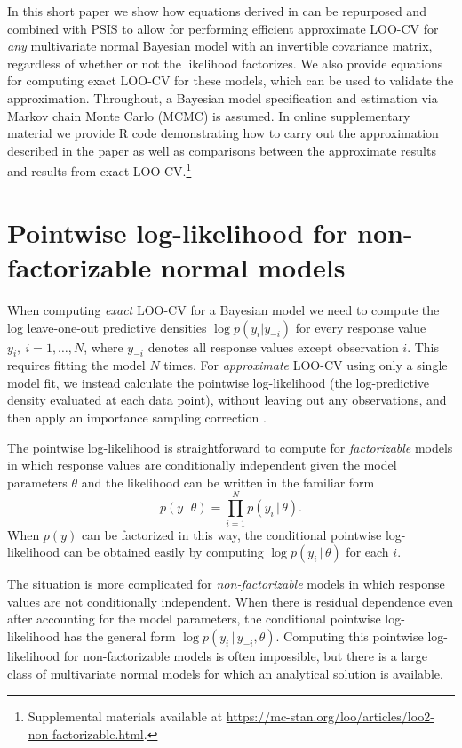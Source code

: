 \documentclass[11pt]{article}
\begin{document}
In this short paper we show how equations derived in \cite{sundararajan2001} can
be repurposed and combined with PSIS to allow for performing efficient
approximate LOO-CV for \emph{any} multivariate normal Bayesian model with an
invertible covariance matrix, regardless of whether or not the likelihood
factorizes. We also provide equations for computing exact LOO-CV for these
models, which can be used to validate the approximation. Throughout, a Bayesian
model specification and estimation via Markov chain Monte Carlo (MCMC) is
assumed. In online supplementary material we provide R code demonstrating how to
carry out the approximation described in the paper as well as comparisons
between the approximate results and results from exact LOO-CV.\footnote{
Supplemental materials available at  \url{https://mc-stan.org/loo/articles/loo2-non-factorizable.html}.}


\section{Pointwise log-likelihood for non-factorizable normal models}
\label{sec-pointwise}

When computing \emph{exact} LOO-CV for a Bayesian model we need to compute the
log leave-one-out predictive densities $\log{p(y_i | y_{-i})}$ for every
response value $y_i, \: i = 1, \ldots, N$, where $y_{-i}$ denotes all response
values except observation $i$. This requires fitting the model $N$ times. For
\emph{approximate} LOO-CV using only a single model fit, we instead calculate
the pointwise log-likelihood (the log-predictive density evaluated at
each data point), without leaving out any observations, and then apply an
importance sampling correction \citep{gelfand1992, vehtari2017loo}.

The pointwise log-likelihood is straightforward to compute for
\emph{factorizable} models in which response values are conditionally
independent given the model parameters $\theta$ and the likelihood can be
written in the familiar form
%
\begin{equation}
p(y \,|\, \theta) = \prod_{i=1}^N p(y_i \,|\, \theta).
\end{equation}
%
When $p(y)$ can be factorized in this way, the conditional pointwise
log-likelihood can be obtained easily by computing $\log p(y_i \,|\, \theta)$
for each $i$.

The situation is more complicated for \emph{non-factorizable} models in which
response values are not conditionally independent. When there is residual
dependence even after accounting for the model parameters, the conditional
pointwise log-likelihood has the general form $\log p(y_i \,|\, y_{-i},
\theta)$. Computing this pointwise log-likelihood for non-factorizable models is 
often impossible, but there is a large class of multivariate normal models for which 
an analytical solution is available.
\end{document}
